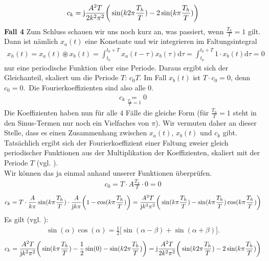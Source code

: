 \documentclass[11pt,a4paper,DIV=12]{scrartcl}
\newcommand{\diff}{\mathrm{d}}
\begin{document}
\begin{align}
	c_k=\im\frac{A^2T}{2k^2\pi^2}\bigg (\sin(k2\pi\frac{T_h}{T})-2\sin(k\pi\frac{T_h}{T})\bigg )
\end{align}
\textbf{Fall 4}
Zum Schluss schauen wir uns noch kurz an, was passiert, wenn $\frac{T_h}{T}=1$ gilt. Dann ist nämlich $x_{a}(t)$ eine Konstante und wir integrieren im Faltungsintegral
\begin{align}
	x_{h}(t)=x_{a}(t)\circledast x_{b}(t)=\int_{t_0}^{t_0+T}x_{a}(t-\tau)x_{b}(\tau)\diff \tau=\int_{t_0}^{t_0+T}1\cdot x_{b}(t)\diff \tau = 0
\end{align}
nur eine periodische Funktion über eine Periode. Daraus ergibt sich der Gleichanteil, skaliert um die Periode $T$: $c_0T$. Im Fall $x_b(t)$ ist $T\cdot c_0=0$, denn $c_0=0$.\
Die Fourierkoeffizienten sind also alle $0$.
\begin{align}
	c_k\underset{\frac{T_h}{T}=1}{=}0
\end{align}
Die Koeffizienten haben nun für alle $4$ Fälle die gleiche Form (für $\frac{T_h}{T}=1$ steht in den Sinus-Termen nur noch ein Vielfaches von $\pi$). Wir vermuten daher an dieser Stelle, dass es einen Zusammenhang zwischen $x_{a}(t)$, $x_{b}(t)$ und $c_k$ gibt.\\
Tatsächlich ergibt sich der Fourierkoeffizient einer Faltung zweier gleich periodischer Funktionen aus der Multiplikation der Koeffizienten, skaliert mit der Periode $T$ (vgl. \cite[S. 208]{Oppenheim1997_2}).\\
Wir können das ja einmal anhand unserer Funktionen überprüfen.
\begin{align}
	c_0=T\cdot A\frac{T_h}{T}\cdot 0 =0
\end{align}
\begin{align}
	c_k=T\cdot \frac{A}{k\pi}\sin(k\pi\frac{T_h}{T})\cdot\frac{A}{\im k \pi}\bigg (1-\cos(k\pi\frac{T_h}{T})\bigg )=\frac{A^2T}{\im k ^2\pi^2}\bigg(\sin(k\pi\frac{T_h}{T})-\sin(k\pi\frac{T_h}{T})\cos(k\pi\frac{T_h}{T})\bigg )
\end{align}
Es gilt (vgl. \cite[Kap.2, S. 83]{Bronstein}):
\begin{align}
	\sin(\alpha)\cos(\alpha)=\frac{1}{2}\bigg [\sin(\alpha-\beta)+\sin(\alpha+\beta)\bigg ].
\end{align}
\begin{align}
	c_k=\frac{A^2T}{\im k^2\pi^2}\bigg (\sin(k\pi\frac{T_h}{T})-\frac{1}{2}\sin(0)-\sin(k2\pi\frac{T_h}{T})\bigg )=\im\frac{A^2T}{2k^2\pi^2}\bigg (\sin(k2\pi\frac{T_h}{T})-2\sin(k\pi\frac{T_h}{T})\bigg )
\end{align}
\end{document}
